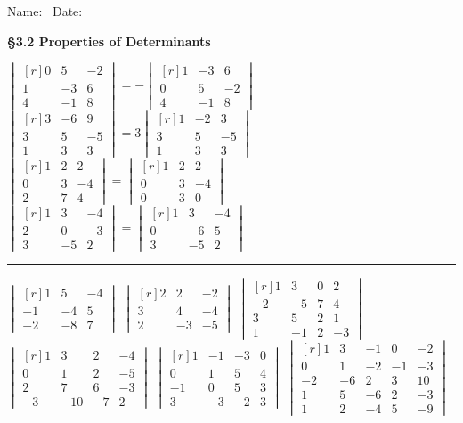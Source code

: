 \documentclass[11pt,answers]{exam} %
\newcommand{\dett}[1]{\begin{vmatrix*}[r] #1 \end{vmatrix*}}
\begin{document}
\flushleft
Name:\ \makebox[4in]{\hrulefill} \hspace{1in} Date:\ \makebox[1in]{\hrulefill}
\begin{center}
    \textbf{\S 3.2 Properties of Determinants}
\end{center}


\begin{questions}
    \question $\dett{0 & 5 & -2 \\ 1 & -3 & 6 \\ 4 & -1 & 8} = -\dett{1 & -3 & 6  \\ 0 & 5 & -2 \\ 4 & -1 & 8}$
    \question $\dett{3 & -6 & 9 \\ 3 & 5 & -5 \\ 1 & 3 & 3} = 3 \dett{1 & -2 & 3 \\ 3 & 5 & -5 \\ 1 & 3 & 3}$
    \question $\dett{1 & 2 & 2 \\ 0 & 3 & -4 \\2 & 7 & 4} = \dett{1 & 2 & 2 \\ 0 & 3 & -4 \\ 0 & 3 & 0}$
    \question $\dett{1 & 3 & -4 \\ 2 & 0 & -3 \\ 3 & -5 & 2} = \dett{1 & 3 & -4 \\ 0 & -6 & 5 \\ 3 & -5 & 2}$
    \begin{center}\rule{4in}{0.1mm}\end{center}
    \question $\dett{1 & 5 & -4 \\ -1 & -4 & 5 \\ -2 & -8 & 7}$
    \question $\dett{2 & 2 & -2 \\ 3 & 4 & -4 \\ 2 & -3 & -5}$
    \question $\dett{1 & 3 & 0 & 2 \\ -2 & -5 & 7 & 4 \\3 & 5 & 2 & 1 \\ 1 & -1 & 2 & -3}$
    \question $\dett{1 & 3 & 2 & -4 \\ 0 & 1 & 2 & -5 \\ 2 & 7 & 6 & -3 \\ -3 & -10 & -7 & 2}$
    \question $\dett{1 & -1 & -3 & 0 \\ 0 & 1 & 5 & 4 \\ -1 & 0 & 5 & 3 \\ 3 & -3 & -2 & 3}$
    \question $\dett{1 & 3 & -1 & 0 & -2 \\ 0 & 1 & -2 & -1 & -3 \\ -2 & -6 & 2 & 3 & 10 \\ 1 & 5 & -6 & 2 & -3 \\ 1 & 2 & -4 & 5 & -9}$


\end{questions}
\end{document}
